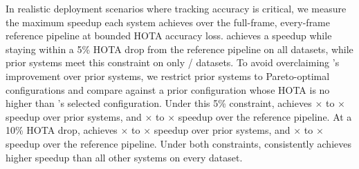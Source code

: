 In realistic deployment scenarios where tracking accuracy is critical,
we measure the maximum speedup each system achieves over the full-frame,
every-frame reference pipeline at bounded HOTA accuracy loss.
\sys{} achieves a speedup while staying within a 5\% HOTA drop from the reference pipeline on all
\revisionDatasetCount{} datasets,
while prior systems meet this constraint on only \comparePriorMeetFivePct{}/\revisionDatasetCount{} datasets.
To avoid overclaiming \sys{}'s improvement over prior systems,
we restrict prior systems to Pareto-optimal configurations and compare against a prior configuration whose HOTA is no higher than \sys{}'s selected configuration.
Under this 5\% constraint,
\sys{} achieves \compareAccuracyMatchedSpeedupMinFivePct{}$\times$ to \compareAccuracyMatchedSpeedupMaxFivePct{}$\times$ speedup over prior systems,
and \compareNaiveSpeedupMinFivePct{}$\times$ to \compareNaiveSpeedupMaxFivePct{}$\times$ speedup over the reference pipeline.
At a 10\% HOTA drop,
\sys{} achieves \compareAccuracyMatchedSpeedupMinTenPct{}$\times$ to \compareAccuracyMatchedSpeedupMaxTenPct{}$\times$ speedup over prior systems,
and \compareNaiveSpeedupMinTenPct{}$\times$ to \compareNaiveSpeedupMaxTenPct{}$\times$ speedup over the reference pipeline.
Under both constraints,
\sys{} consistently achieves higher speedup than all other systems on every dataset.

